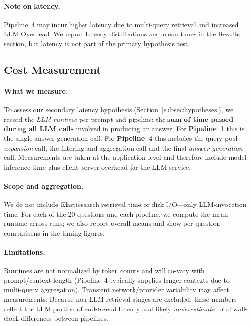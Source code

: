 \documentclass[manuscript,screen]{acmart}
\begin{document}
\begin{CCSXML}
	\paragraph{Note on latency.}
	Pipeline~4 may incur higher latency due to multi-query retrieval and increased LLM Overhead. We report latency distributions and mean times in the Results section, but latency is not part of the primary hypothesis test.


		
	\subsection{Cost Measurement}
	\label{subsec:cost-measure}

	\paragraph{What we measure.}
	To assess our secondary latency hypothesis (Section~\ref{subsec:hypotheses}), we record the
	\emph{LLM runtime} per prompt and pipeline: the \textbf{sum of time passed during all LLM
	calls} involved in producing an answer. For \textbf{Pipeline~1} this is the single
	answer-generation call. For \textbf{Pipeline~4} this includes the query-pool \emph{expansion}
	call, the filtering and aggregation call and the final \emph{answer-generation} call. Measurements are taken at the application level and
	therefore include model inference time plus client–server overhead for the LLM service.
	
	\paragraph{Scope and aggregation.}
	We do not include Elasticsearch retrieval time or disk I/O—only LLM-invocation time. For each
	of the 20 questions and each pipeline, we compute the mean runtime across runs; we also report
	overall means and show per-question comparisons in the timing figures.
	
	\paragraph{Limitations.}
	Runtimes are not normalized by token counts and will co-vary with prompt/context length
	(Pipeline~4 typically supplies longer contexts due to multi-query aggregation). Transient
	network/provider variability may affect measurements. Because non-LLM retrieval stages are
	excluded, these numbers reflect the LLM portion of end-to-end latency and likely
	\emph{underestimate} total wall-clock differences between pipelines.


\end{CCSXML}
\end{document}
